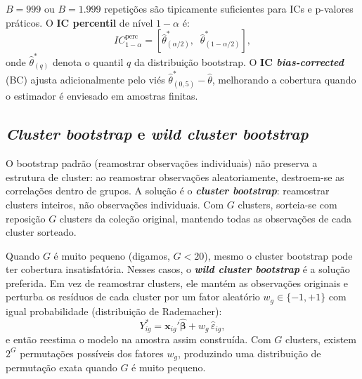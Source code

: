 $B = 999$ ou $B = 1{.}999$ repetições são tipicamente suficientes para ICs e p-valores práticos. O \textbf{IC percentil} de nível $1-\alpha$ é:
\begin{equation}
  IC^{\text{perc}}_{1-\alpha} = \left[\hat{\theta}^*_{(\alpha/2)},\;\; \hat{\theta}^*_{(1-\alpha/2)}\right],
  \label{eq:ic_bootstrap}
\end{equation}
onde $\hat{\theta}^*_{(q)}$ denota o quantil $q$ da distribuição bootstrap. O \textbf{IC \textit{bias-corrected}} (BC) ajusta adicionalmente pelo viés $\hat{\theta}^*_{(0{,}5)} - \hat{\theta}$, melhorando a cobertura quando o estimador é enviesado em amostras finitas.

\subsection*{\textit{Cluster bootstrap} e \textit{wild cluster bootstrap}}

O bootstrap padrão (reamostrar observações individuais) não preserva a estrutura de cluster: ao reamostrar observações aleatoriamente, destroem-se as correlações dentro de grupos. A solução é o \textbf{\textit{cluster bootstrap}}: reamostrar clusters inteiros, não observações individuais. Com $G$ clusters, sorteia-se com reposição $G$ clusters da coleção original, mantendo todas as observações de cada cluster sorteado.

Quando $G$ é muito pequeno (digamos, $G < 20$), mesmo o cluster bootstrap pode ter cobertura insatisfatória. Nesses casos, o \textbf{\textit{wild cluster bootstrap}} \citep{Cameron2008} é a solução preferida. Em vez de reamostrar clusters, ele mantém as observações originais e perturba os resíduos de cada cluster por um fator aleatório $w_g \in \{-1, +1\}$ com igual probabilidade (distribuição de Rademacher):
\begin{equation}
  Y_{ig}^* = \boldsymbol{x}_{ig}'\hat{\boldsymbol{\beta}} + w_g\, \hat{\varepsilon}_{ig},
  \label{eq:wild_bootstrap}
\end{equation}
e então reestima o modelo na amostra assim construída. Com $G$ clusters, existem $2^G$ permutações possíveis dos fatores $w_g$, produzindo uma distribuição de permutação exata quando $G$ é muito pequeno.

